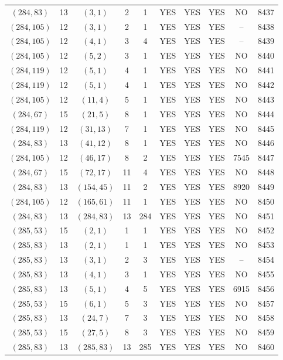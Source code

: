 \begin{longtable}{|c|c|c|c|c|c|c|c|c|c|}
$(284, 83)$ & 13 & $(3, 1)$ & 2 & 1 & YES & YES & YES & NO & 8437\\
$(284, 105)$ & 12 & $(3, 1)$ & 2 & 1 & YES & YES & YES & -- & 8438\\
$(284, 105)$ & 12 & $(4, 1)$ & 3 & 4 & YES & YES & YES & -- & 8439\\
$(284, 105)$ & 12 & $(5, 2)$ & 3 & 1 & YES & YES & YES & NO & 8440\\
$(284, 119)$ & 12 & $(5, 1)$ & 4 & 1 & YES & YES & YES & NO & 8441\\
$(284, 119)$ & 12 & $(5, 1)$ & 4 & 1 & YES & YES & YES & NO & 8442\\
$(284, 105)$ & 12 & $(11, 4)$ & 5 & 1 & YES & YES & YES & NO & 8443\\
$(284, 67)$ & 15 & $(21, 5)$ & 8 & 1 & YES & YES & YES & NO & 8444\\
$(284, 119)$ & 12 & $(31, 13)$ & 7 & 1 & YES & YES & YES & NO & 8445\\
$(284, 83)$ & 13 & $(41, 12)$ & 8 & 1 & YES & YES & YES & NO & 8446\\
$(284, 105)$ & 12 & $(46, 17)$ & 8 & 2 & YES & YES & YES & 7545 & 8447\\
$(284, 67)$ & 15 & $(72, 17)$ & 11 & 4 & YES & YES & YES & NO & 8448\\
$(284, 83)$ & 13 & $(154, 45)$ & 11 & 2 & YES & YES & YES & 8920 & 8449\\
$(284, 105)$ & 12 & $(165, 61)$ & 11 & 1 & YES & YES & YES & NO & 8450\\
$(284, 83)$ & 13 & $(284, 83)$ & 13 & 284 & YES & YES & YES & NO & 8451\\
$(285, 53)$ & 15 & $(2, 1)$ & 1 & 1 & YES & YES & YES & NO & 8452\\
$(285, 83)$ & 13 & $(2, 1)$ & 1 & 1 & YES & YES & YES & NO & 8453\\
$(285, 83)$ & 13 & $(3, 1)$ & 2 & 3 & YES & YES & YES & -- & 8454\\
$(285, 83)$ & 13 & $(4, 1)$ & 3 & 1 & YES & YES & YES & NO & 8455\\
$(285, 83)$ & 13 & $(5, 1)$ & 4 & 5 & YES & YES & YES & 6915 & 8456\\
$(285, 53)$ & 15 & $(6, 1)$ & 5 & 3 & YES & YES & YES & NO & 8457\\
$(285, 83)$ & 13 & $(24, 7)$ & 7 & 3 & YES & YES & YES & NO & 8458\\
$(285, 53)$ & 15 & $(27, 5)$ & 8 & 3 & YES & YES & YES & NO & 8459\\
$(285, 83)$ & 13 & $(285, 83)$ & 13 & 285 & YES & YES & YES & NO & 8460\\

\end{longtable}
